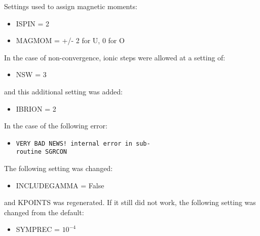 \documentclass{article}
\begin{document}
\vspace{5mm}
\noindent
Settings used to assign magnetic moments: 
\begin{itemize}
  \item{ ISPIN = 2 }
  \item{ MAGMOM = +/- 2 for U, 0 for O }
\end{itemize}
  
\vspace{5mm}
\noindent
In the case of non-convergence, ionic steps were allowed at a setting
of: 
\begin{itemize}
  \item{ NSW = 3 }
\end{itemize}
\noindent
and this additional setting was added: 
\begin{itemize}
  \item{ IBRION = 2 }
\end{itemize}

\vspace{5mm}
\noindent
In the case of the following error: 
\begin{itemize}
  \item{
      \verb|VERY BAD NEWS! internal error in sub-|\\
      \verb|routine SGRCON|}
\end{itemize}
\noindent
The following setting was changed:
\noindent
\begin{itemize}
  \item{ INCLUDEGAMMA = False}
\end{itemize}
and KPOINTS was regenerated. If it still did not work, the following
setting was changed from the default: 
\begin{itemize}
  \item{ SYMPREC = $10^{-4}$ }
\end{itemize}
\end{document}
